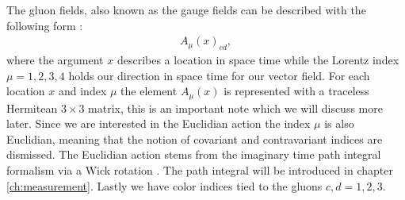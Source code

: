 \documentclass[english,twoside,openright]{UH_TCM_MSc}
\begin{document}
The gluon fields, also known as the gauge fields can be described with the following form \cite[p.~26]{gattringer2009quantum}:
\begin{align}
    A_\mu(x)_{cd},
\end{align}
where the argument $x$ describes a location in space time while the Lorentz index $\mu = 1,2,3,4$ holds our direction in space time for our vector field. For each location $x$ and index $\mu$ the element $A_\mu(x)$ is represented with a traceless Hermitean $3\times 3$ matrix, this is an important note which we will discuss more later. Since we are interested in the Euclidian action the index $\mu$ is also Euclidian, meaning that the notion of covariant and contravariant indices are dismissed. The Euclidian action stems from the imaginary time path integral formalism via a Wick rotation \cite{Rothe:1992nt}. The path integral will be introduced in chapter \ref{ch:measurement}. Lastly we have color indices tied to the gluons $c,d = 1,2,3$.
\end{document}
